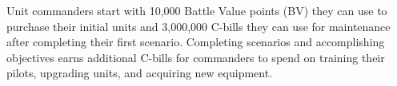 Unit commanders start with 10,000 Battle Value points (BV) they can use to purchase their initial units and 3,000,000 C-bills they can use for maintenance after completing their first scenario.
Completing scenarios and accomplishing objectives earns additional C-bills for commanders to spend on training their pilots, upgrading units, and acquiring new equipment.
